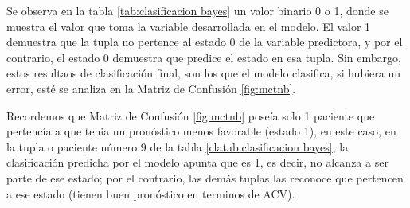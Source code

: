     Se observa en la tabla \ref{tab:clasificacion bayes} un valor binario 0 o 1, donde se muestra el valor que toma la variable desarrollada en el modelo. El valor 1 demuestra que la tupla no pertence al estado 0 de la variable predictora, y por el contrario, el estado 0 demuestra que predice el estado en esa tupla. Sin embargo, estos resultaos de clasificación final, son los que el modelo clasifica, si hubiera un error, esté se analiza en la Matriz de Confusión \ref{fig:mctnb}.
\par Recordemos que Matriz de Confusión \ref{fig:mctnb} poseía solo 1 paciente que pertencía a que tenia un pronóstico menos favorable (estado 1), en este caso, en la tupla o paciente número 9 de la tabla \ref{clatab:clasificacion bayes}, la clasificación predicha por el modelo apunta que es 1, es decir, no alcanza a ser parte de ese estado; por el contrario, las demás tuplas las reconoce que pertencen a ese estado (tienen buen pronóstico en terminos de ACV).\\
    
    